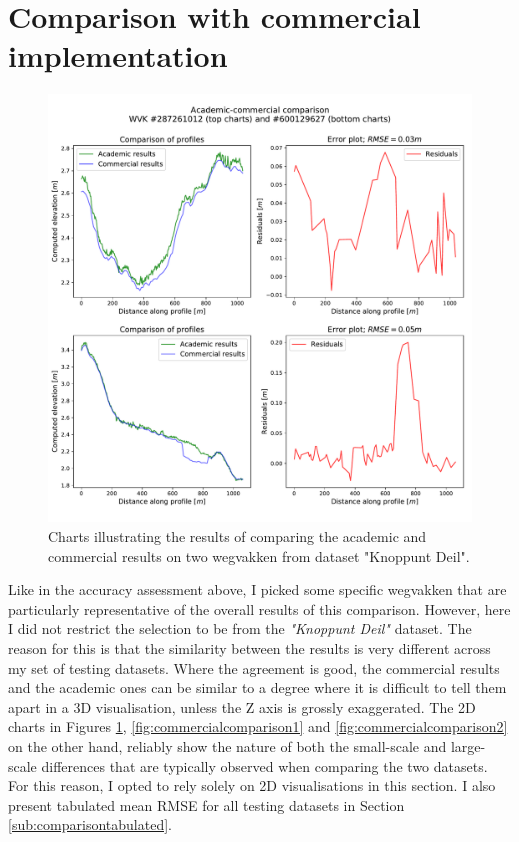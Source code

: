 \section{Comparison with commercial implementation}
\label{sec:r_comparison}

\begin{figure}
    \centering
    \includegraphics[width=0.9\linewidth]{final_report/figs/commercialcomparison0.pdf}
    \caption{Charts illustrating the results of comparing the academic and commercial results on two wegvakken from dataset "Knoppunt Deil".}
    \label{fig:commercialcomparison0}
\end{figure}

Like in the accuracy assessment above, I picked some specific wegvakken that are particularly representative of the overall results of this comparison. However, here I did not restrict the selection to be from the \textit{"Knoppunt Deil"} dataset. The reason for this is that the similarity between the results is very different across my set of testing datasets. Where the agreement is good, the commercial results and the academic ones can be similar to a degree where it is difficult to tell them apart in a 3D visualisation, unless the Z axis is grossly exaggerated. The 2D charts in Figures \ref{fig:commercialcomparison0}, \ref{fig:commercialcomparison1} and \ref{fig:commercialcomparison2} on the other hand, reliably show the nature of both the small-scale and large-scale differences that are typically observed when comparing the two datasets. For this reason, I opted to rely solely on 2D visualisations in this section. I also present tabulated mean RMSE for all testing datasets in Section \ref{sub:comparisontabulated}.

